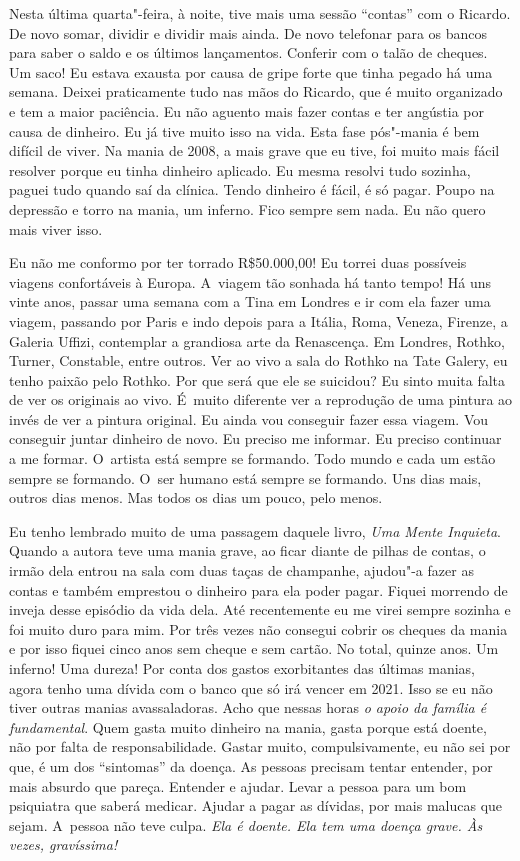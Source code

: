 Nesta última quarta"-feira, à noite, tive mais uma sessão ``contas'' com
o Ricardo. De novo somar, dividir e dividir mais ainda. De novo
telefonar para os bancos para saber o saldo e os últimos lançamentos.
Conferir com o talão de cheques. Um saco! Eu estava exausta por causa de
gripe forte que tinha pegado há uma semana. Deixei praticamente tudo nas
mãos do Ricardo, que é muito organizado e tem a maior paciência. Eu não
aguento mais fazer contas e ter angústia por causa de dinheiro. Eu já
tive muito isso na vida. Esta fase pós"-mania é bem difícil de viver. Na
mania de 2008, a mais grave que eu tive, foi muito mais fácil resolver
porque eu tinha dinheiro aplicado. Eu mesma resolvi tudo sozinha, paguei
tudo quando saí da clínica. Tendo dinheiro é fácil, é só pagar. Poupo na
depressão e torro na mania, um inferno. Fico sempre sem nada. Eu não
quero mais viver isso.

Eu não me conformo por ter torrado R\$50.000,00! Eu torrei duas
possíveis viagens confortáveis à Europa. A~viagem tão sonhada há tanto
tempo! Há uns vinte anos, passar uma semana com a Tina em Londres e ir
com ela fazer uma viagem, passando por Paris e indo depois para a
Itália, Roma, Veneza, Firenze, a Galeria Uffizi, contemplar a grandiosa
arte da Renascença. Em Londres, Rothko, Turner, Constable, entre outros.
Ver ao vivo a sala do Rothko na Tate Galery, eu tenho paixão pelo
Rothko. Por que será que ele se suicidou? Eu sinto muita falta de ver os
originais ao vivo. É~muito diferente ver a reprodução de uma pintura ao
invés de ver a pintura original. Eu ainda vou conseguir fazer essa
viagem. Vou conseguir juntar dinheiro de novo. Eu preciso me informar.
Eu preciso continuar a me formar. O~artista está sempre se formando.
Todo mundo e cada um estão sempre se formando. O~ser humano está sempre
se formando. Uns dias mais, outros dias menos. Mas todos os dias um
pouco, pelo menos.

Eu tenho lembrado muito de uma passagem daquele livro, \emph{Uma Mente
Inquieta}. Quando a autora teve uma mania grave, ao ficar diante de
pilhas de contas, o irmão dela entrou na sala com duas taças de
champanhe, ajudou"-a fazer as contas e também emprestou o dinheiro para
ela poder pagar. Fiquei morrendo de inveja desse episódio da vida dela.
Até recentemente eu me virei sempre sozinha e foi muito duro para mim.
Por três vezes não consegui cobrir os cheques da mania e por isso fiquei
cinco anos sem cheque e sem cartão. No total, quinze anos. Um inferno!
Uma dureza! Por conta dos gastos exorbitantes das últimas manias, agora
tenho uma dívida com o banco que só irá vencer em 2021. Isso se eu não
tiver outras manias avassaladoras. Acho que nessas horas \emph{o apoio
da família é fundamental}. Quem gasta muito dinheiro na mania, gasta
porque está doente, não por falta de responsabilidade. Gastar muito,
compulsivamente, eu não sei por que, é um dos ``sintomas'' da doença. As
pessoas precisam tentar entender, por mais absurdo que pareça. Entender
e ajudar. Levar a pessoa para um bom psiquiatra que saberá medicar.
Ajudar a pagar as dívidas, por mais malucas que sejam. A~pessoa não teve
culpa. \emph{Ela é doente. Ela tem uma doença grave. Às vezes,
gravíssima!}

